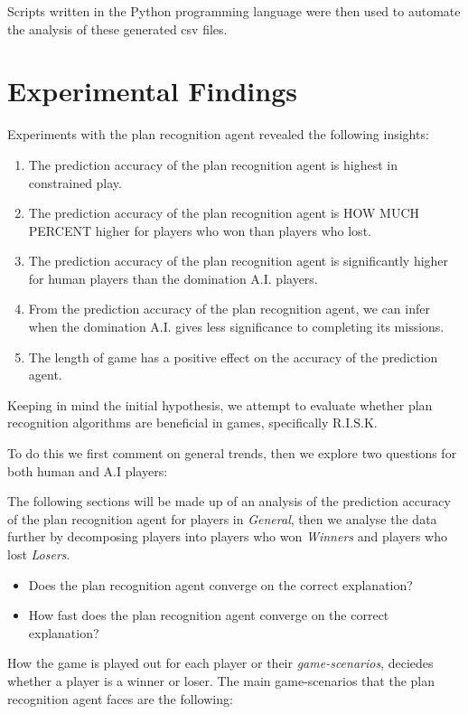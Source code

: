 \documentclass[parskip]{cs4rep}
\begin{document}
Scripts written in the Python programming language were then used to automate the analysis of these generated csv files.

\newpage

\section{Experimental Findings}

Experiments with the plan recognition agent revealed the following insights:

\begin{enumerate}
\item
The prediction accuracy of the plan recognition agent is highest in constrained play. 
\item
The prediction accuracy of the plan recognition agent is HOW MUCH PERCENT higher for players who won than players who lost.
\item
The prediction accuracy of the plan recognition agent is significantly higher for human players than the domination A.I. players.
\item
From the prediction accuracy of the plan recognition agent, we can infer when the domination A.I. gives less significance to completing its missions.
\item
The length of game has a positive effect on the accuracy of the prediction agent.
\end{enumerate}

Keeping in mind the initial hypothesis, we attempt to evaluate whether plan recognition algorithms are beneficial in games, specifically R.I.S.K.

To do this we first comment on general trends, then we explore two questions for both human and A.I players:

The following sections will be made up of an analysis of the prediction accuracy of the plan recognition agent for players in \textit{General}, then we analyse the data further by decomposing players into players who won \textit{Winners} and players who lost \textit{Losers}.

\begin{itemize}
\item
Does the plan recognition agent converge on the correct explanation?
\item
How fast does the plan recognition agent converge on the correct explanation?
\end{itemize}

How the game is played out for each player or their \textit{game-scenarios}, deciedes whether a player is a winner or loser.  The main game-scenarios that the plan recognition agent faces are the following:
\end{document}
